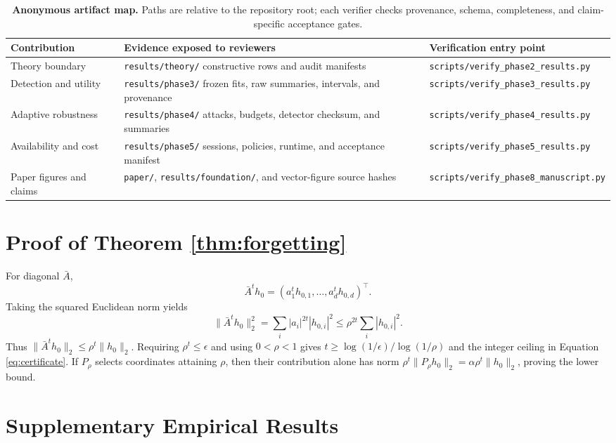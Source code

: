 \documentclass[sigconf]{acmart}
\begin{document}
\appendix
\begin{table}[t]
\caption{\textbf{Anonymous artifact map.} Paths are relative to the repository
root; each verifier checks provenance, schema, completeness, and claim-specific
acceptance gates.}
\label{tab:artifact-map}
\centering\small
\begin{tabularx}{\textwidth}{@{}lYY@{}}
\toprule
Contribution & Evidence exposed to reviewers & Verification entry point \\
\midrule
Theory boundary & \texttt{results/theory/} constructive rows and audit manifests & \texttt{scripts/verify\_phase2\_results.py} \\
Detection and utility & \texttt{results/phase3/} frozen fits, raw summaries, intervals, and provenance & \texttt{scripts/verify\_phase3\_results.py} \\
Adaptive robustness & \texttt{results/phase4/} attacks, budgets, detector checksum, and summaries & \texttt{scripts/verify\_phase4\_results.py} \\
Availability and cost & \texttt{results/phase5/} sessions, policies, runtime, and acceptance manifest & \texttt{scripts/verify\_phase5\_results.py} \\
Paper figures and claims & \texttt{paper/}, \texttt{results/foundation/}, and vector-figure source hashes & \texttt{scripts/verify\_phase8\_manuscript.py} \\
\bottomrule
\end{tabularx}
\end{table}

\section{Proof of Theorem \ref{thm:forgetting}}
\label{app:diagonal-proof}
For diagonal $\bar A$,
\[
 \bar A^t h_0=(a_1^t h_{0,1},\ldots,a_d^t h_{0,d})^\top.
\]
Taking the squared Euclidean norm yields
\[
 \|\bar A^t h_0\|_2^2=\sum_i|a_i|^{2t}|h_{0,i}|^2
 \le\rho^{2t}\sum_i|h_{0,i}|^2.
\]
Thus $\|\bar A^t h_0\|_2\le\rho^t\|h_0\|_2$. Requiring
$\rho^t\le\epsilon$ and using $0<\rho<1$ gives
$t\ge\log(1/\epsilon)/\log(1/\rho)$ and the integer ceiling in
Equation \eqref{eq:certificate}. If $P_\rho$ selects coordinates attaining
$\rho$, then their contribution alone has norm
$\rho^t\|P_\rho h_0\|_2=\alpha\rho^t\|h_0\|_2$, proving the lower bound.

\section{Supplementary Empirical Results}
\end{document}
